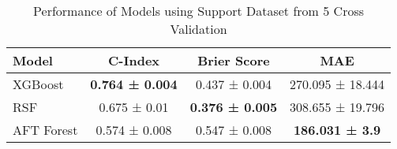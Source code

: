 \begin{table}[h!]
\centering
\caption{Performance of Models using Support Dataset from 5 Cross Validation}
\label{tab:performance_support}
\begin{tabular}{l|c|c|c}
\hline
\textbf{Model} & \textbf{C-Index} & \textbf{Brier Score} & \textbf{MAE} \\
\hline
XGBoost & \textbf{0.764 ± 0.004} & 0.437 ± 0.004 & 270.095 ± 18.444 \\
RSF & 0.675 ± 0.01 & \textbf{0.376 ± 0.005} & 308.655 ± 19.796 \\
AFT Forest & 0.574 ± 0.008 & 0.547 ± 0.008 & \textbf{186.031 ± 3.9} \\
\hline
\end{tabular}
\end{table}
